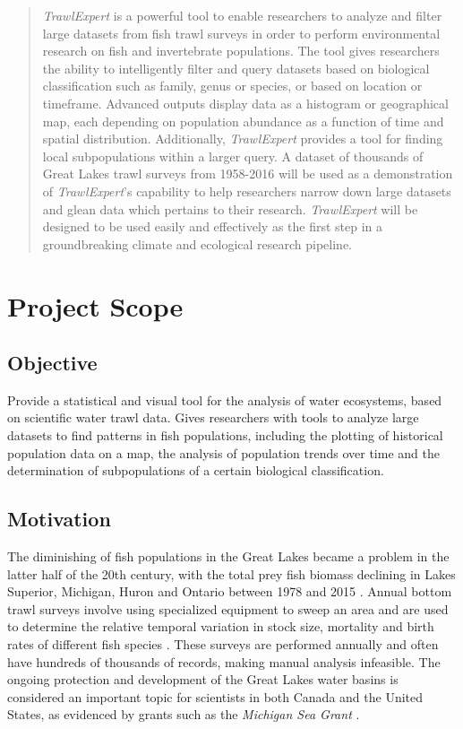\documentclass{article}
\begin{document}
\begin{abstract}
\noindent \textit{TrawlExpert} is a powerful tool to enable researchers to analyze and filter large datasets from fish trawl surveys in order to perform environmental research on fish and invertebrate populations. The tool gives researchers the ability to intelligently filter and query datasets based on biological classification such as family, genus or species, or based on location or timeframe. Advanced outputs display data as a histogram or geographical map, each depending on population abundance as a function of time and spatial distribution. Additionally, \textit{TrawlExpert} provides a tool for finding local subpopulations within a larger query. A dataset of thousands of Great Lakes trawl surveys from 1958-2016 will be used as a demonstration of \textit{TrawlExpert}'s capability to help researchers narrow down large datasets and glean data which pertains to their research. \textit{TrawlExpert} will be designed to be used easily and effectively as the first step in a groundbreaking climate and ecological research pipeline.
\end{abstract}


\tableofcontents


\section{Project Scope}
\subsection{Objective}
Provide a statistical and visual tool for the analysis of water ecosystems, based on scientific water trawl data. Gives researchers with tools to analyze large datasets to find patterns in fish populations, including the plotting of historical population data on a map, the analysis of population trends over time and the determination of subpopulations of a certain biological classification.

\subsection{Motivation}
The diminishing of fish populations in the Great Lakes became a problem in the latter half of the 20th century, with the total prey fish biomass declining in Lakes Superior, Michigan, Huron and Ontario between 1978 and 2015 \citep{michigan2017}. Annual bottom trawl surveys involve using specialized equipment to sweep an area and are used to determine the relative temporal variation in stock size, mortality and birth rates of different fish species \citep{walsh1997efficiency}. These surveys are performed annually and often have hundreds of thousands of records, making manual analysis infeasible. The ongoing protection and development of the Great Lakes water basins is considered an important topic for scientists in both Canada and the United States, as evidenced by grants such as the \textit{Michigan Sea Grant} \citep{michseagr2018}.
\end{document}
